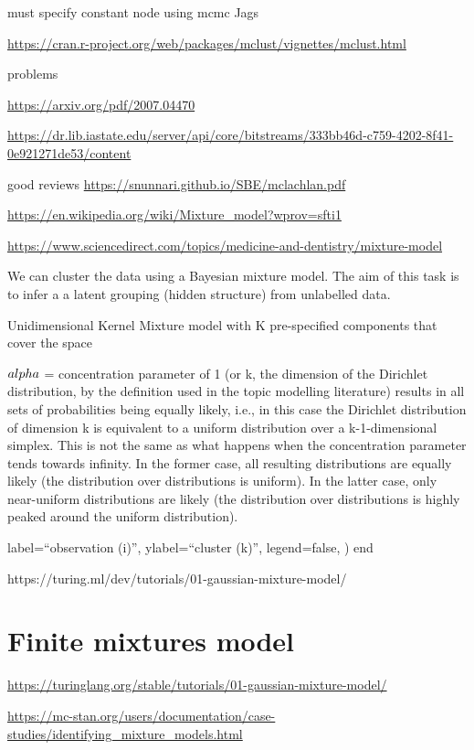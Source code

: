 \documentclass[12pt,letterpaper,]{paper}
\begin{document}
must specify constant node using mcmc Jags

\url{https://cran.r-project.org/web/packages/mclust/vignettes/mclust.html}

problems

\url{https://arxiv.org/pdf/2007.04470}

\url{https://dr.lib.iastate.edu/server/api/core/bitstreams/333bb46d-c759-4202-8f41-0e921271de53/content}

good reviews \url{https://snunnari.github.io/SBE/mclachlan.pdf}

\url{https://en.wikipedia.org/wiki/Mixture_model?wprov=sfti1}

\url{https://www.sciencedirect.com/topics/medicine-and-dentistry/mixture-model}

We can cluster the data using a Bayesian mixture model. The aim of this
task is to infer a a latent grouping (hidden structure) from unlabelled
data.

Unidimensional Kernel Mixture model with K pre-specified components that
cover the space

\(\\alpha\) = concentration parameter of 1 (or k, the dimension of the
Dirichlet distribution, by the definition used in the topic modelling
literature) results in all sets of probabilities being equally likely,
i.e., in this case the Dirichlet distribution of dimension k is
equivalent to a uniform distribution over a k-1-dimensional simplex.
This is not the same as what happens when the concentration parameter
tends towards infinity. In the former case, all resulting distributions
are equally likely (the distribution over distributions is uniform). In
the latter case, only near-uniform distributions are likely (the
distribution over distributions is highly peaked around the uniform
distribution).

label=``observation (i)'', ylabel=``cluster (k)'', legend=false, ) end

https://turing.ml/dev/tutorials/01-gaussian-mixture-model/

\section{Finite mixtures model}\label{finite-mixtures-model}

\url{https://turinglang.org/stable/tutorials/01-gaussian-mixture-model/}

\url{https://mc-stan.org/users/documentation/case-studies/identifying_mixture_models.html}
\end{document}
